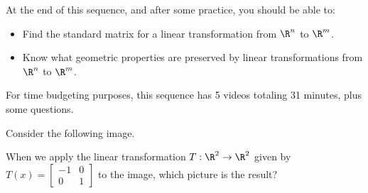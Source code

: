 




At the end of this sequence, and after some practice, you should be able to:

\begin{itemize}
\item Find the standard matrix for a linear transformation from $\R^n$ to $\R^m$.   
\item Know what geometric properties are preserved by linear transformations from 
$\R^n$ to $\R^m$.  
\end{itemize}

For time budgeting purposes, this sequence has 5 videos totaling 31 minutes, 
plus some questions.  



\endedxtext

\endedxvertical







Consider the following image.  

\begin{center}
 
\end{center}

When we apply the linear transformation $T: \R^2 \rightarrow \R^2$ given by $T(x) = \left[ \begin{array}{cc}
-1 & 0 \\ 0 & 1 \end{array} \right]$ to the image, which picture is the result?

\begin{center}
 
\\
 

\end{center}




